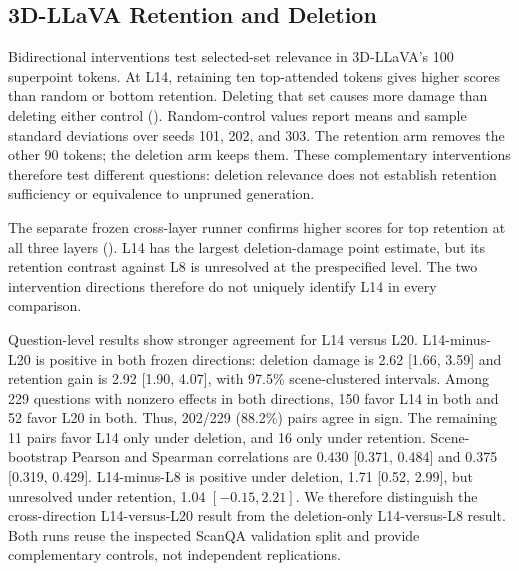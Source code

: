 \subsection{3D-LLaVA Retention and Deletion}
Bidirectional interventions test selected-set relevance in 3D-LLaVA's 100 superpoint tokens. At L14, retaining ten top-attended tokens gives higher scores than random or bottom retention. Deleting that set causes more damage than deleting either control (). Random-control values report means and sample standard deviations over seeds 101, 202, and 303. The retention arm removes the other 90 tokens; the deletion arm keeps them. These complementary interventions therefore test different questions: deletion relevance does not establish retention sufficiency or equivalence to unpruned generation.

\begin{table}[t]
\centering
\caption{Bidirectional L14 intervention on 3D-LLaVA ScanQA.}
\label{tab:supp_bidir}
\end{table}

The separate frozen cross-layer runner confirms higher scores for top retention at all three layers (). L14 has the largest deletion-damage point estimate, but its retention contrast against L8 is unresolved at the prespecified level. The two intervention directions therefore do not uniquely identify L14 in every comparison.

Question-level results show stronger agreement for L14 versus L20. L14-minus-L20 is positive in both frozen directions: deletion damage is 2.62 [1.66, 3.59] and retention gain is 2.92 [1.90, 4.07], with 97.5\% scene-clustered intervals. Among 229 questions with nonzero effects in both directions, 150 favor L14 in both and 52 favor L20 in both. Thus, 202/229 (88.2\%) pairs agree in sign. The remaining 11 pairs favor L14 only under deletion, and 16 only under retention. Scene-bootstrap Pearson and Spearman correlations are 0.430 [0.371, 0.484] and 0.375 [0.319, 0.429]. L14-minus-L8 is positive under deletion, 1.71 [0.52, 2.99], but unresolved under retention, 1.04 $[-0.15, 2.21]$. We therefore distinguish the cross-direction L14-versus-L20 result from the deletion-only L14-versus-L8 result. Both runs reuse the inspected ScanQA validation split and provide complementary controls, not independent replications.



